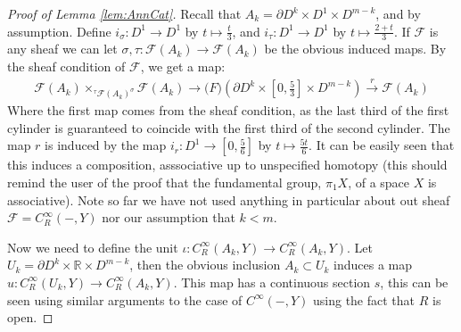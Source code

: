 \documentclass{article}
\newtheorem{proposed work}[theorem]{Proposed Work}
\theoremstyle{definition}
\begin{document}
\begin{proof}[Proof of Lemma \ref{lem:AnnCat}]
Recall that $A_k=\partial D^k \times D^1 \times D^{m-k}$, and by assumption. Define $i_\sigma: D^1 \to D^1$ by $t\mapsto \frac{t}{3}$, and $i_\tau:D^1\to D^1$ by $t\mapsto \frac{2+t}{3}$. If $\mathcal{F}$ is any sheaf we can let $\sigma,\tau :\mathcal{F}(A_k)\to \mathcal{F}(A_k)$ be the obvious induced maps. By the sheaf condition of $\mathcal{F}$, we get a map:
\begin{align*}
\mathcal{F}(A_k)\times_{{}^\tau\mathcal{F}(A_k)^\sigma} \mathcal{F}(A_k)\to \mathcal(F)(\partial D^k\times [0,\frac{5}{3}] \times D^{m-k}) \stackrel{r}{\to}  \mathcal{F}(A_k)
\end{align*} 
Where the first map comes from the sheaf condition, as the last third of the first cylinder is guaranteed to coincide with the first third of the second cylinder. The map $r$ is induced by the map $i_r:D^1\to [0,\frac{5}{6}]$ by $t\mapsto \frac{5t}{6}$. It can be easily seen that this induces a composition, asssociative up to unspecified homotopy (this should remind the user of the proof that the fundamental group, $\pi_1X$, of a space $X$ is associative). Note so far we have not used anything in particular about out sheaf $\mathcal{F}=C^\infty_R(-,Y)$ nor our assumption that $k<m$.

Now we need to define the unit $\iota: C^\infty_R(A_k,Y)\to C^\infty_R(A_k,Y)$. Let $U_k=\partial D^k \times \mathbb{R} \times D^{m-k}$, then the obvious inclusion $A_k\subset U_k$ induces a map $u:C^\infty_R(U_k,Y)\to C^\infty_R(A_k,Y)$. This map has a continuous section $s$, this can be seen using similar arguments to the case of $C^\infty(-, Y)$ using the fact that $R$ is open.


\end{proof}
\end{document}
